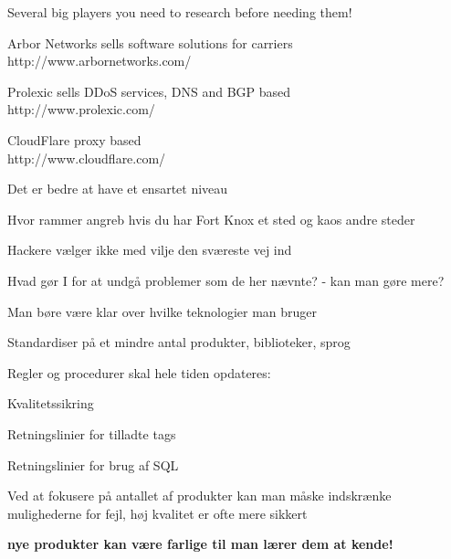 \documentclass[20pt,landscape,a4paper,footrule]{foils}
\begin{document}


\begin{list2}
\item Several big players you need to research before needing them!
\item Arbor Networks sells software solutions for carriers\\
http://www.arbornetworks.com/

\item Prolexic sells DDoS services, DNS and BGP based\\
http://www.prolexic.com/

\item CloudFlare proxy based\\
http://www.cloudflare.com/
\end{list2}






\begin{list1}
\item Det er bedre at have et ensartet niveau
\item Hvor rammer angreb hvis du har Fort Knox et sted og kaos andre steder
\item Hackere vælger ikke med vilje den sværeste vej ind
\end{list1}









\begin{list1}
\item Hvad gør I for at undgå problemer som de her nævnte?
- kan man gøre mere?
\item Man børe være klar over hvilke teknologier man bruger
\item Standardiser på et mindre antal produkter, biblioteker, sprog
\item Regler og procedurer skal hele tiden opdateres:
\begin{list2}
\item Kvalitetssikring
\item Retningslinier for tilladte tags
\item Retningslinier for brug af SQL
\end{list2}

\item Ved at fokusere på antallet af produkter kan man måske
  indskrænke mulighederne for fejl, høj kvalitet er ofte mere sikkert

\item {\bf nye produkter kan være farlige til man lærer dem at kende!}
\end{list1}
\end{document}
